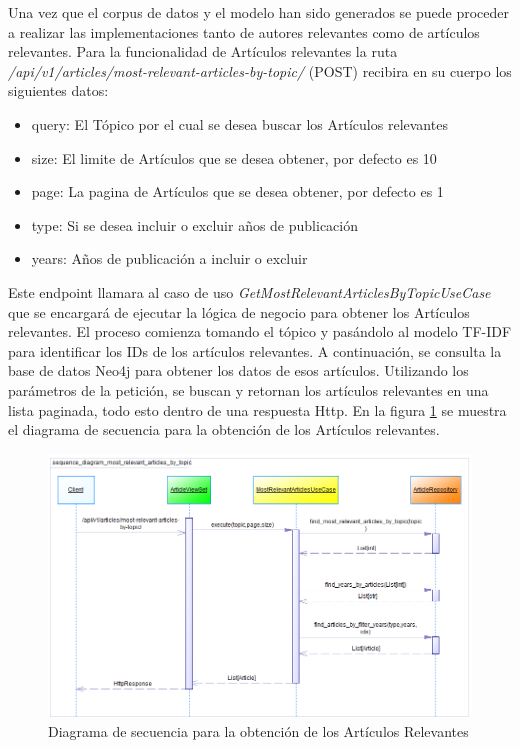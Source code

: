Una vez que el corpus de datos y el modelo han sido generados se puede proceder a realizar las implementaciones tanto de autores relevantes como de artículos relevantes.
Para la funcionalidad de Artículos relevantes la ruta \textit{/api/v1/articles/most-relevant-articles-by-topic/} (POST) recibira en su cuerpo los siguientes datos:
\begin{itemize}
    \item query: El Tópico por el cual se desea buscar los Artículos relevantes
    \item size: El limite de Artículos que se desea obtener, por defecto es 10
    \item page: La pagina de Artículos que se desea obtener, por defecto es 1
    \item type: Si se desea incluir o excluir años de publicación
    \item years: Años de publicación a incluir o excluir
\end{itemize}
Este endpoint llamara al caso de uso \textit{GetMostRelevantArticlesByTopicUseCase} que se encargará de ejecutar la lógica de negocio para obtener los Artículos relevantes.
El proceso comienza tomando el tópico y pasándolo al modelo TF-IDF para identificar los IDs de los artículos relevantes. A continuación, se consulta la base de datos Neo4j para obtener los datos de esos artículos. Utilizando los parámetros de la petición, se buscan y retornan los artículos relevantes en una lista paginada, todo esto dentro de una respuesta Http.
En la figura \ref{fig:sequence-diagram-get-most-relevant-articles} se muestra el diagrama de secuencia para la obtención de los Artículos relevantes.

\begin{figure}[H]
    \centering
\includegraphics[scale=0.7]{../02Figures/02Chapter/Sprints/Sprint-4/sequence_diagram_most_relevant_articles_by_topic.png}
    \caption{Diagrama de secuencia para la obtención de los Artículos Relevantes}
    \label{fig:sequence-diagram-get-most-relevant-articles}
\end{figure}

